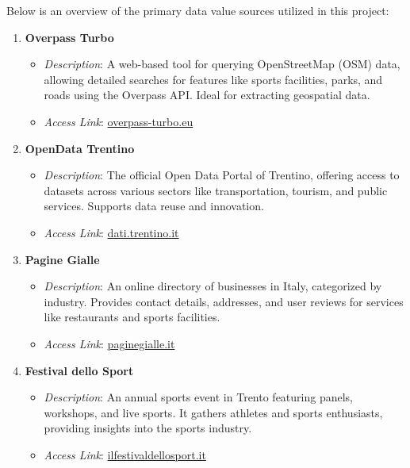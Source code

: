 \noindent Below is an overview of the primary data value sources utilized in this project:
\begin{enumerate}
    \item \textbf{Overpass Turbo}
    \begin{itemize}
        \item \textit{Description}: A web-based tool for querying OpenStreetMap (OSM) data, allowing detailed searches for features like sports facilities, parks, and roads using the Overpass API. Ideal for extracting geospatial data.
        \item \textit{Access Link}: \href{https://overpass-turbo.eu/}{overpass-turbo.eu}
    \end{itemize}

    \item \textbf{OpenData Trentino}
    \begin{itemize}
        \item \textit{Description}: The official Open Data Portal of Trentino, offering access to datasets across various sectors like transportation, tourism, and public services. Supports data reuse and innovation.
        \item \textit{Access Link}: \href{https://dati.trentino.it/dataset}{dati.trentino.it}
    \end{itemize}
    
    \item \textbf{Pagine Gialle}
    \begin{itemize}
        \item \textit{Description}: An online directory of businesses in Italy, categorized by industry. Provides contact details, addresses, and user reviews for services like restaurants and sports facilities.
        \item \textit{Access Link}: \href{https://www.paginegialle.it/}{paginegialle.it}
    \end{itemize}

    \item \textbf{Festival dello Sport}
    \begin{itemize}
        \item \textit{Description}: An annual sports event in Trento featuring panels, workshops, and live sports. It gathers athletes and sports enthusiasts, providing insights into the sports industry.
        \item \textit{Access Link}: \href{https://www.ilfestivaldellosport.it/programma/}{ilfestivaldellosport.it}
    \end{itemize}


\end{enumerate}
